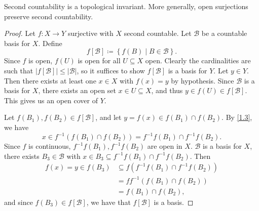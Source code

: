 \documentclass[11pt, letterpaper]{article}
\theoremstyle{theorem}
\begin{document}
\begin{lemma}\label{1.4}
	Second countability is a topological invariant. More generally, open surjections preserve second countability.
\end{lemma}
\begin{proof}
	Let $f : X \to  Y$ surjective with $X$ second countable. Let $\mathcal{B} $ be a countable basis for $X$. Define
	\[
		f[\mathcal{B} ]\coloneqq \left\{ f(B)\mid B\in \mathcal{B}  \right\} 
	.\]
	Since $f$ is open, $f(U)$ is open for all $U\subseteq X$ open. Clearly the cardinalities are such that $\left| f[\mathcal{B} ] \right| \leq \left| \mathcal{B}  \right| $, so it suffices to show $f[\mathcal{B} ]$ is a basis for $Y$. Let $y\in Y$. Then there exists at least one $x\in X$ with $f(x)=y$ by hypothesis. Since $\mathcal{B} $ is a basis for $X$, there exists an open set $x\in U\subseteq X$, and thus $y\in f(U)\in f[\mathcal{B} ]$. This gives us an open cover of $Y$.

	Let $f(B_1),f(B_2)\in f[\mathcal{B} ]$, and let $y=f(x)\in f(B_1)\cap f(B_2)$. By \cref{1.3}, we have
	\[
		x\in f^{-1} (f(B_1)\cap f(B_2))=f^{-1} f(B_1)\cap f^{-1} f(B_2)
	.\]
	Since $f$ is continuous, $f^{-1} f(B_1),f^{-1} f(B_2)$ are open in $X$. $\mathcal{B} $ is a basis for $X$, there exists $B_3\in \mathcal{B} $ with $x\in B_3 \subseteq f^{-1} f(B_1) \cap f^{-1} f(B_2)$. Then
	\begin{align*}
		f(x)=y\in f(B_3)&\subseteq f(f^{-1} f(B_1)\cap f^{-1} f(B_2))\\
				&=ff^{-1} (f(B_1)\cap f(B_2))\\
				&=f(B_1)\cap f(B_2)
	,\end{align*}
	and since $f(B_3)\in f[\mathcal{B} ]$, we have that $f[\mathcal{B} ]$ is a basis.
\end{proof}
\end{document}
